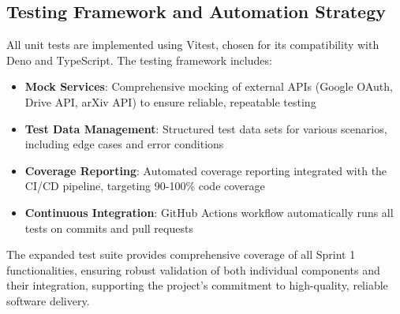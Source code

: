 \documentclass[12pt]{article}
\begin{document}
\subsection{Testing Framework and Automation Strategy}
All unit tests are implemented using Vitest, chosen for its compatibility with Deno and TypeScript. The testing framework includes:

\begin{itemize}
  \item \textbf{Mock Services}: Comprehensive mocking of external APIs (Google OAuth, Drive API, arXiv API) to ensure reliable, repeatable testing
  \item \textbf{Test Data Management}: Structured test data sets for various scenarios, including edge cases and error conditions
  \item \textbf{Coverage Reporting}: Automated coverage reporting integrated with the CI/CD pipeline, targeting 90-100\% code coverage
  \item \textbf{Continuous Integration}: GitHub Actions workflow automatically runs all tests on commits and pull requests
\end{itemize}

The expanded test suite provides comprehensive coverage of all Sprint 1 functionalities, ensuring robust validation of both individual components and their integration, supporting the project's commitment to high-quality, reliable software delivery.
\end{document}
